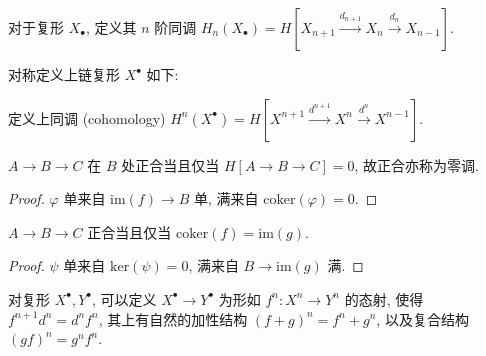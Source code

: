 \begin{definition}
    对于复形 \(X_\bullet\), 定义其 \(n\) 阶同调 \(H_n (X_\bullet) = H[X_{n+1} \xrightarrow{d_{n+1}} X_n \xrightarrow{d_{n}} X_{n-1}]\).
\end{definition}

\begin{definition}
    对称定义上链复形 \(X^\bullet\) 如下:

    \begin{center}
    \end{center}

    定义上同调 (cohomology) \(H^n (X^\bullet) = H[X^{n+1} \xrightarrow{d^{n+1}} X^n \xrightarrow{d^{n}} X^{n-1}]\).
\end{definition}

\begin{corollary}
    \(A \to B \to C\) 在 \(B\) 处正合当且仅当 \(H [A \to B \to C] = 0\), 故正合亦称为零调.

    \begin{proof}
        \(\varphi\) 单来自 \(\mathrm{im} (f) \to B\) 单, 满来自 \(\mathrm{coker} (\varphi) = 0\).
    \end{proof}
\end{corollary}

\begin{corollary}
    \(A \to B \to C\) 正合当且仅当 \(\mathrm{coker} (f) = \mathrm{im} (g)\).

    \begin{proof}
        \(\psi\) 单来自 \(\mathrm{ker} (\psi) = 0\), 满来自 \(B \to \mathrm{im} (g)\) 满.
    \end{proof}
\end{corollary}

\begin{definition}
    对复形 \(X^\bullet, Y^\bullet\), 可以定义 \(X^\bullet \to Y^\bullet\) 为形如 \(f^n : X^n \to Y^n\) 的态射, 使得 \(f^{n+1} d^n = d^n f^n\),
    其上有自然的加性结构 \({(f + g)}^n = f^n + g^n\), 以及复合结构 \({(g f)}^n = g^n f^n\).
\end{definition}

